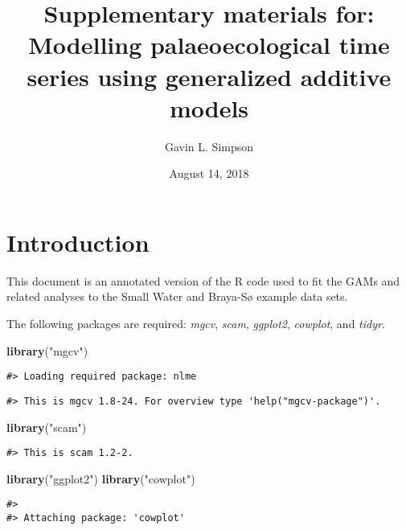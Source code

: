 \documentclass[12pt,]{article}
\title{Supplementary materials for: Modelling palaeoecological time series
using generalized additive models}
\author{Gavin L. Simpson}
\date{August 14, 2018}
\newenvironment{Shaded}{\begin{snugshade}}{\end{snugshade}}
\newcommand{\KeywordTok}[1]{\textcolor[rgb]{0.13,0.29,0.53}{\textbf{{#1}}}}
\newcommand{\StringTok}[1]{\textcolor[rgb]{0.31,0.60,0.02}{{#1}}}
\newcommand{\NormalTok}[1]{{#1}}
\begin{document}
\maketitle

\section{Introduction}\label{introduction}

This document is an annotated version of the R code used to fit the GAMs
and related analyses to the Small Water and Braya-Sø example data sets.

The following packages are required: \emph{mgcv}, \emph{scam},
\emph{ggplot2}, \emph{cowplot}, and \emph{tidyr}.

\begin{Shaded}
\begin{Highlighting}[]
\KeywordTok{library}\NormalTok{(}\StringTok{"mgcv"}\NormalTok{)}
\end{Highlighting}
\end{Shaded}

\begin{verbatim}
#> Loading required package: nlme
\end{verbatim}

\begin{verbatim}
#> This is mgcv 1.8-24. For overview type 'help("mgcv-package")'.
\end{verbatim}

\begin{Shaded}
\begin{Highlighting}[]
\KeywordTok{library}\NormalTok{(}\StringTok{"scam"}\NormalTok{)}
\end{Highlighting}
\end{Shaded}

\begin{verbatim}
#> This is scam 1.2-2.
\end{verbatim}

\begin{Shaded}
\begin{Highlighting}[]
\KeywordTok{library}\NormalTok{(}\StringTok{"ggplot2"}\NormalTok{)}
\KeywordTok{library}\NormalTok{(}\StringTok{"cowplot"}\NormalTok{)}
\end{Highlighting}
\end{Shaded}

\begin{verbatim}
#> 
#> Attaching package: 'cowplot'
\end{verbatim}
\end{document}
